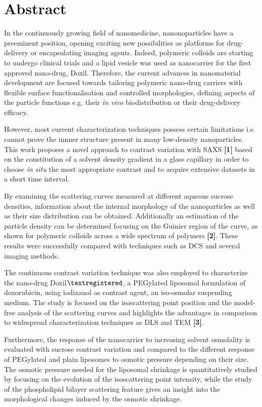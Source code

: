 \chapter*{Abstract}
\thispagestyle{empty}


In the continuously growing field of nanomedicine, nanonoparticles have a preeminent position, opening exciting new possibilities as platforms for drug-delivery or encapsulating imaging agents. Indeed, polymeric colloids are starting to undergo clinical trials and a lipid vesicle was used as nanocarrier for the first approved nano-drug, Doxil. Therefore, the current advances in nanomaterial development are focused towards tailoring polymeric nano-drug carriers with flexible surface functionalisation and controlled morphologies, defining aspects of the particle functions e.g. their \emph{in vivo} biodistribution or their drug-delivery efficacy. 

However, most current characterization techniques possess certain limitations i.e. cannot prove the innner structure present in many low-density nanoparticles. This work proposes a novel approach to contrast variation with SAXS \textbf{[1]} based on the constitution of a solvent density gradient in a glass capillary in order to choose \emph{in situ} the most appropriate contrast and to acquire extensive datasets in a short time interval.

By examining the scattering curves measured at different aqueous sucrose densities, information about the internal morphology of the nanoparticles as well as their size distribution can be obtained. Additionally an estimation of the particle density can be determined focusing on the Guinier region of the curve, as shown for polymeric colloids across a wide spectrum of polymers \textbf{[2]}. These results were successfully compared with techniques such as DCS and several imaging methods.

The continuous contrast variation technique was also employed to characterize the nano-drug Doxil$\textregistered$, a PEGylated liposomal formulation of doxorubicin, using iodixanol as contrast agent, an iso-osmolar suspending medium. The study is focused on the isoscattering point position and the model-free analysis of the scattering curves and highlights the advantages in comparison to widespread characterization techniques as DLS and TEM \textbf{[3]}.

Furthermore, the response of the nanocarrier to increasing solvent osmolality is evaluated with sucrose contrast variation and compared to the different response of PEGylated and plain liposomes to osmotic pressure depending on their size. The osmotic pressure needed for the liposomal shrinkage is quantitatively studied by focusing on the evolution of the isoscattering point intensity, while the study of the phospholipid bilayer scattering feature gives an insight into the morphological changes induced by the osmotic shrinkage.

